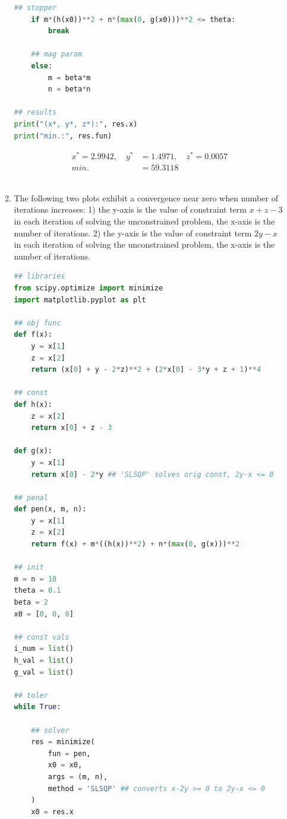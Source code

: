 \documentclass{article}
\begin{document}
\begin{enumerate}
\begin{enumerate}
\begin{lstlisting}[language=Python, title=Fig. Python 3(b)]
    ## stopper
    if m*(h(x0))**2 + n*(max(0, g(x0)))**2 <= theta:
        break

    ## mag param
    else:
        m = beta*m
        n = beta*n

## results
print("(x*, y*, z*):", res.x)
print("min.:", res.fun)
\end{lstlisting}

    \begin{equation}
        \begin{split}
            x^* = 2.9942, \quad y^* &= 1.4971, \quad z^* = 0.0057\\
            min. &= 59.3118
        \end{split}
    \end{equation}\\
        
        \item The following two plots exhibit a convergence near zero when number of iterations increases: 1) the y-axis is the value of constraint term $x + z - 3$ in each iteration of solving the unconstrained problem, the x-axis is the number of iterations. 2) the y-axis is the value of constraint term $2y - x$ in each iteration of solving the unconstrained problem, the x-axis is the number of iterations.\\
        
\begin{lstlisting}[language=Python, title=Fig. Python 3(c)]
## libraries
from scipy.optimize import minimize
import matplotlib.pyplot as plt

## obj func
def f(x):
    y = x[1]
    z = x[2]
    return (x[0] + y - 2*z)**2 + (2*x[0] - 3*y + z + 1)**4

## const
def h(x):
    z = x[2]
    return x[0] + z - 3

def g(x):
    y = x[1]
    return x[0] - 2*y ## 'SLSQP' solves orig const, 2y-x <= 0

## penal
def pen(x, m, n):
    y = x[1]
    z = x[2]
    return f(x) + m*((h(x))**2) + n*(max(0, g(x)))**2

## init
m = n = 10
theta = 0.1
beta = 2
x0 = [0, 0, 0]

## const vals
i_num = list()
h_val = list()
g_val = list()

## toler
while True:

    ## solver
    res = minimize(
        fun = pen, 
        x0 = x0,
        args = (m, n),
        method = 'SLSQP' ## converts x-2y >= 0 to 2y-x <= 0
    )
    x0 = res.x


\end{lstlisting}
\end{enumerate}
\end{enumerate}
\end{document}
